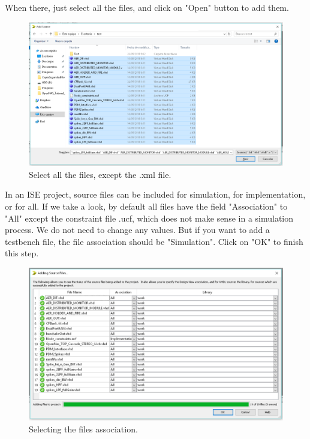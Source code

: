 When there, just select all the files, and click on "Open" button to add them.

\begin{figure}[H]
\centering
\includegraphics[width=1\textwidth]{images/Img36_SelectFiles_bis.PNG}
\caption{\label{fig:ISE_select_all}Select all the files, except the .xml file.}
\end{figure}

In an ISE project, source files can be included for simulation, for implementation, or for all. If we take a look, by default all files have the field "Association" to "All" except the constraint file .ucf, which does not make sense in a simulation process. We do not need to change any values. But if you want to add a testbench file, the file association should be "Simulation". Click on "OK" to finish this step.

\begin{figure}[H]
\centering
\includegraphics[width=1\textwidth]{images/Img37_AddFilesDone_bis.PNG}
\caption{\label{fig:ISE_accept_add}Selecting the files association.}
\end{figure}

